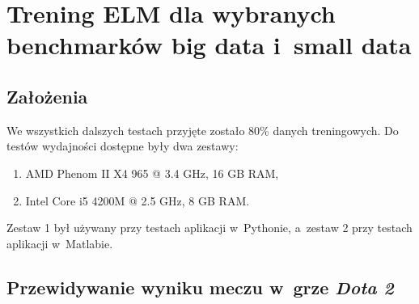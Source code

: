 \documentclass[pl]{minipw} %
\begin{document}
\chapter{Trening ELM dla wybranych benchmarków big data i~small data}
\section{Założenia}
We wszystkich dalszych testach przyjęte zostało 80\% danych treningowych. Do testów wydajności dostępne były dwa zestawy:
\begin{enumerate}
\item AMD Phenom II X4 965 @ 3.4 GHz, 16 GB RAM,
\item Intel Core i5 4200M @ 2.5 GHz, 8 GB RAM.
\end{enumerate}
Zestaw 1 był używany przy testach aplikacji w~Pythonie, a~zestaw 2 przy testach aplikacji w~Matlabie.
\section{Przewidywanie wyniku meczu w~grze \textit{Dota 2}}
\end{document}
